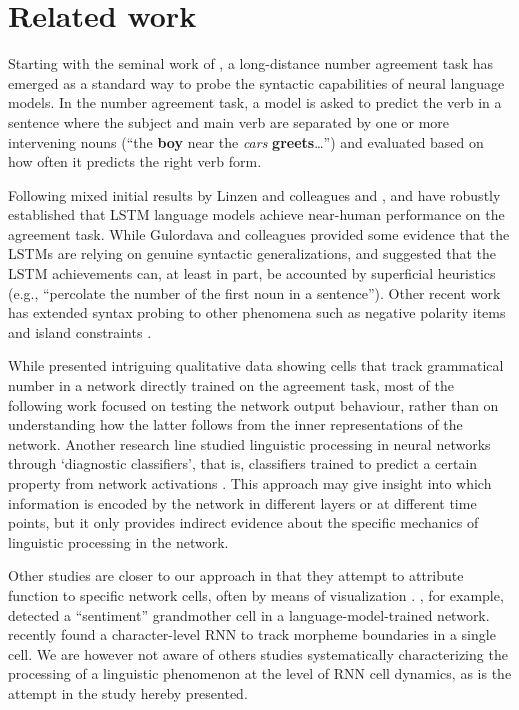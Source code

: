 
\section{Related work}

Starting with the seminal work of , a long-distance number agreement task has emerged as a standard way to probe the syntactic capabilities of neural language models.
In the number agreement task, a model is asked to predict the verb in a sentence where the subject and main verb are separated by one or more intervening nouns (``the \textbf{boy} near the \textit{cars} \textbf{greets}\ldots'') and evaluated based on how often it predicts the right verb form.

Following mixed initial results by Linzen and colleagues and ,  and
 have robustly established that LSTM language models
achieve near-human performance on the agreement task. While Gulordava and
colleagues provided some evidence that the LSTMs are relying on
genuine syntactic generalizations,  and
 suggested that the LSTM achievements
can, at least in part, be accounted by superficial heuristics (e.g., ``percolate the number of the first noun in a sentence''). Other
recent work has extended syntax probing to other phenomena such as
negative polarity items and island constraints
\cite{Chowdhury:Zamparelli:2018,jumelet2018language,marvin2018targeted,wilcox2018rnn}.

While  presented intriguing qualitative data
showing cells that track grammatical number in a network directly trained on
the agreement task, most of the following work focused on testing the
network output behaviour, rather than on understanding how the latter
follows from the inner representations of the network. Another research line
studied linguistic processing in neural networks through `diagnostic classifiers', that is, classifiers trained to
predict a certain property from network activations
\cite[e.g.,][]{gelderloos2016phonemes,Adi:etal:2017,alain2017understanding,Hupkes:etal:2017}. This approach may give insight into which information is encoded by the
network in different layers or at different time points, but it only
provides indirect evidence about the specific mechanics of linguistic
processing in the network.

Other studies are closer to our approach in that they attempt to
attribute function to specific network cells, often by means of
visualization
\cite{Karpathy:etal:2016,li2016visualizing,tang2017memory}. ,
for example, detected a ``sentiment'' grandmother cell in a
language-model-trained network.  
recently found a character-level RNN to track morpheme boundaries in a
single cell. We are however not aware of others studies systematically
characterizing the processing of a linguistic phenomenon at the level of
RNN cell dynamics, as is the attempt in the study hereby presented.
